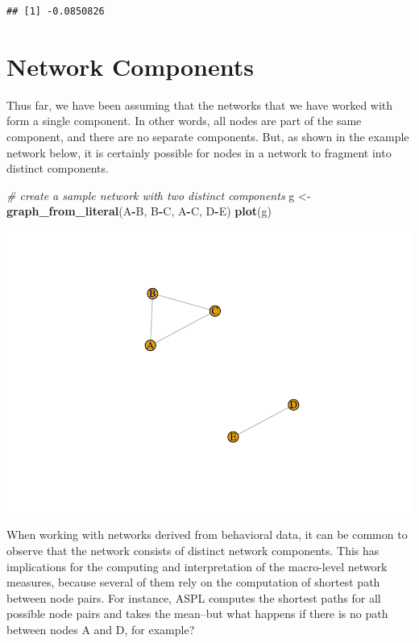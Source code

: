 \documentclass[
]{book}
\newenvironment{Shaded}{\begin{snugshade}}{\end{snugshade}}
\newcommand{\CommentTok}[1]{\textcolor[rgb]{0.56,0.35,0.01}{\textit{#1}}}
\newcommand{\FunctionTok}[1]{\textcolor[rgb]{0.13,0.29,0.53}{\textbf{#1}}}
\newcommand{\NormalTok}[1]{#1}
\newcommand{\OtherTok}[1]{\textcolor[rgb]{0.56,0.35,0.01}{#1}}
\newcommand{\SpecialCharTok}[1]{\textcolor[rgb]{0.81,0.36,0.00}{\textbf{#1}}}
\begin{document}
\begin{verbatim}
## [1] -0.0850826
\end{verbatim}

\section{Network Components}\label{network-components}

Thus far, we have been assuming that the networks that we have worked with form a single component. In other words, all nodes are part of the same component, and there are no separate components. But, as shown in the example network below, it is certainly possible for nodes in a network to fragment into distinct components.

\begin{Shaded}
\begin{Highlighting}[]
\CommentTok{\# create a sample network with two distinct components }
\NormalTok{g }\OtherTok{\textless{}{-}} \FunctionTok{graph\_from\_literal}\NormalTok{(A}\SpecialCharTok{{-}}\NormalTok{B, B}\SpecialCharTok{{-}}\NormalTok{C, A}\SpecialCharTok{{-}}\NormalTok{C, D}\SpecialCharTok{{-}}\NormalTok{E)}
\FunctionTok{plot}\NormalTok{(g)}
\end{Highlighting}
\end{Shaded}

\includegraphics{bookdown-demo_files/figure-latex/unnamed-chunk-67-1.pdf}

When working with networks derived from behavioral data, it can be common to observe that the network consists of distinct network components. This has implications for the computing and interpretation of the macro-level network measures, because several of them rely on the computation of shortest path between node pairs. For instance, ASPL computes the shortest paths for all possible node pairs and takes the mean--but what happens if there is no path between nodes A and D, for example?
\end{document}

